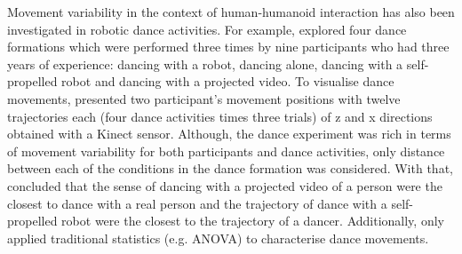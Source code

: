 Movement variability in the context of human-humanoid interaction has also been
investigated in robotic dance activities.
For example, \cite{tsuchida2013} explored four dance formations which were 
performed three times by nine participants who had three years of experience: 
dancing with a robot, dancing alone, dancing with a self-propelled robot and 
dancing with a projected video.
To visualise dance movements, \cite{tsuchida2013} presented two participant's 
movement positions with twelve trajectories each (four dance activities times 
three trials) of z and x directions obtained with a Kinect sensor.
Although, the dance experiment was rich in terms of movement variability
for both participants and dance activities, only distance between each of 
the conditions in the dance formation was considered. 
With that, \cite{tsuchida2013} concluded that the sense of dancing with a 
projected video of a person were the closest to dance with a real person and 
the trajectory of dance with a self-propelled robot were the closest 
to the trajectory of a dancer. Additionally, \cite{tsuchida2013} only applied 
traditional statistics (e.g. ANOVA) to characterise dance movements.





